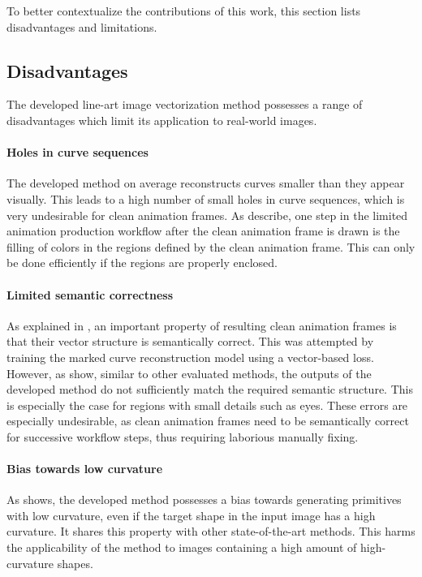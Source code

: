 To better contextualize the contributions of this work, this section lists disadvantages and limitations.

\subsection{Disadvantages}

The developed line-art image vectorization method possesses a range of disadvantages which limit its application to real-world images.

\paragraph{Holes in curve sequences}

The developed method on average reconstructs curves smaller than they appear visually. This leads to a high number of small holes in curve sequences, which is very undesirable for clean animation frames. As  describe, one step in the limited animation production workflow after the clean animation frame is drawn is the filling of colors in the regions defined by the clean animation frame. This can only be done efficiently if the regions are properly enclosed.

\paragraph{Limited semantic correctness}

As explained in , an important property of resulting clean animation frames is that their vector structure is semantically correct. This was attempted by training the marked curve reconstruction model using a vector-based loss. However, as  show, similar to other evaluated methods, the outputs of the developed method do not sufficiently match the required semantic structure. This is especially the case for regions with small details such as eyes. These errors are especially undesirable, as clean animation frames need to be semantically correct for successive workflow steps, thus requiring laborious manually fixing.

\paragraph{Bias towards low curvature}

As  shows, the developed method possesses a bias towards generating primitives with low curvature, even if the target shape in the input image has a high curvature. It shares this property with other state-of-the-art methods. This harms the applicability of the method to images containing a high amount of high-curvature shapes.

